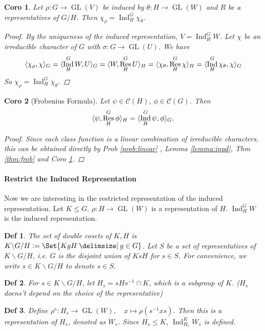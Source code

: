 \documentclass[a4paper]{article}
\DeclarePairedDelimiter{\inpd}{\langle}{\rangle} %
\newcommand*{\defeq}{\vcentcolon=}
\newcommand*{\Cc}{\mathcal{C}}
\DeclareMathOperator{\Res}{Res}
\DeclareMathOperator{\Ind}{Ind}
\newcommand*\GL[1]{\operatorname{GL}\mathopen{}\left({#1}\right)\mathclose{}}
\newcommand*\bsl{\backslash}
\providecommand\given{}
\newcommand*\SetSymbol[1][]{%
  \nonscript\:#1\vert
  \allowbreak
  \nonscript\:
\mathopen{}}
\renewcommand\given{\SetSymbol[\delimsize]}
\renewcommand\given{\SetSymbol[\delimsize]}
\theoremstyle{mystyle}
\newtheorem{definition}{Def}
\newtheorem{coro}{Coro}
\begin{document}
\begin{coro}
  \label{coro:chi}
  Let $\rho: G\to \GL{V}$ be induced by $\theta:H\to \GL{W}$ and
  $R$ be a representatives of $G/H$. Then $\chi_\rho = \Ind^G_H \chi_\theta$.
  \begin{proof}
    By the uniqueness of the induced representation, $V = \Ind^G_H W$.
    Let $\chi$ be an irreducible character of $G$ with
    $\sigma: G\to \GL{U}$. We have
    \[
      \inpd{\chi_\rho, \chi}_G = \inpd{\Ind^G_H W, U}_G
      = \inpd{W, \Res^G_H U}_H = \inpd{\chi_\theta, \Res^G_H \chi}_H
      = \inpd{\Ind^G_H \chi_\theta, \chi}_G
    \]
    So $\chi_\rho = \Ind^G_H \chi_\theta$.
  \end{proof}
\end{coro}

\begin{coro}[Frobenius Formula]
  Let $\psi \in \Cc(H)$, $\phi \in \Cc(G)$. Then
  \[
    \inpd{\psi,\Res^G_H \phi}_H = \inpd{\Ind^G_H \psi,\phi}_G.
  \]
  \begin{proof}
    Since each class function is a linear combination of irreducible
    characters, this can be obtained directly by Prob \ref{prob:linear}
    , Lemma \ref{lemma:inpd}, Thm \ref{thm:frob} and Coro \ref{coro:chi}.
  \end{proof}
\end{coro}

\paragraph{Restrict the Induced Representation}
Now we are interesting in the restricted representation of the induced
representation. Let $K \le G$. $\rho: H\to \GL{W}$ is a representation
of $H$. $\Ind^G_H W$ is the induced representation.

\begin{definition}
  The set of double cosets of $K, H$ is $K \bsl G / H \defeq
  \Set{ KgH \given g \in G}$.
  Let $S$ be a set of representatives of $K\bsl G/H$, i.e.
  $G$ is the disjoint union of $KsH$ for $s\in S$.
  For convenience, we write $s \in K\bsl G/H$ to denote $s\in S$.
\end{definition}

\begin{definition}
  For $s \in K\bsl G/H$, let $H_s = sHs^{-1} \cap K$,
  which is a subgroup of $K$.
  ($H_s$ doens't depend on the choice of the representative)
\end{definition}

\begin{definition}
  Define $\rho^s: H_s \to \GL{W}, \quad x \mapsto \rho(s^{-1}xs)$.
  Then this is a representation of $H_s$, denoted as $W_s$.
  Since $H_s \le K$, $\Ind^K_{H_s} W_s$ is defined.
\end{definition}
\end{document}
